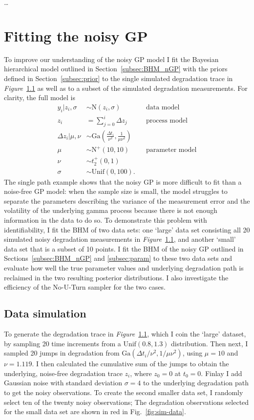 \ldots

\section{Fitting the noisy GP}

To improve our understanding of the noisy GP model I fit the Bayesian hierarchical model outlined in Section~\ref{subsec:BHM_nGP} with the priors defined in Section~\ref{subsec:prior} to the single simulated degradation trace in \textit{Figure}~\ref{} as well as to a subset of the simulated degradation measurements. For clarity, the full model is
\begin{align*}
  y_i|z_i, \sigma & \sim \mbox{N}(z_i, \sigma)  && \mbox{data model} \\
  z_i & = \sum_{j=0}^i \Delta z_j && \mbox{process model} \\ 
  \Delta z_i|\mu, \nu & \sim \mbox{Ga} \left( \frac{\Delta t_i}{\nu^2}, \frac{1}{\mu \nu^2} \right) \\
  \mu & \sim \mbox{N}^{+}(10, 10) && \mbox{parameter model} \\
  \nu & \sim t_2^{+}(0, 1) \\
  \sigma & \sim \mbox{Unif}(0, 100).
\end{align*}
The single path example shows that the noisy GP is more difficult to fit than a noise-free GP model: when the sample size is small, the model struggles to separate the parameters describing the variance of the measurement error and the volatility of the underlying gamma process because there is not enough information in the data to do so. To demonstrate this problem with identifiability, I fit the BHM of two data sets: one `large' data set consisting all 20 simulated noisy degradation measurements in \textit{Figure}~\ref{}, and another `small' data set that is a subset of 10 points. I fit the BHM of the noisy GP outlined in Sections~\ref{subsec:BHM_nGP} and \ref{subsec:param} to these two data sets and evaluate how well the true parameter values and underlying degradation path is reclaimed in the two resulting posterior distributions. I also investigate the efficiency of the No-U-Turn sampler for the two cases.

\subsection{Data simulation}

To generate the degradation trace in \textit{Figure}~\ref{}, which I coin the `large' dataset, by sampling 20 time increments from a $\mbox{Unif}(0.8, 1.3)$ distribution. Then next, I sampled 20 jumps in degradation from $\mbox{Ga}(\Delta t_i/\nu^2, 1/\mu\nu^2)$, using $\mu = 10$ and $\nu = 1.119$. I then calculated the cumulative sum of the jumps to obtain the underlying, noise-free degradation trace $z_i$, where $z_0 = 0$ at $t_0 = 0$. Finlay I add Gaussian noise with standard deviation $\sigma = 4$ to the underlying degradation path to get the noisy observations. To create the second smaller data set, I randomly select ten of the twenty noisy observations; The degradation observations selected for the small data set are shown in red in Fig.~\ref{fig:sim-data}.

